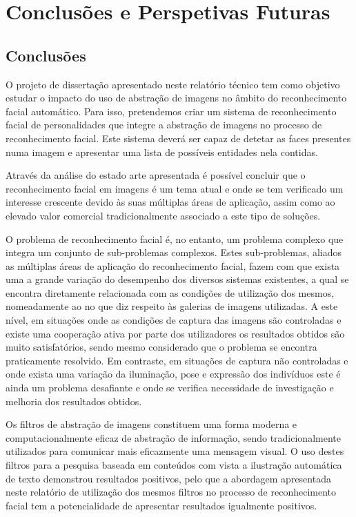 \chapter{Conclusões e Perspetivas Futuras} \label{chap:conclusao}

\section{Conclusões}
O projeto de dissertação apresentado neste relatório técnico tem como objetivo estudar o impacto do uso de abstração de imagens no âmbito do reconhecimento facial automático. Para isso, pretendemos criar um sistema de reconhecimento facial de personalidades que integre a abstração de imagens no processo de reconhecimento facial. Este sistema deverá ser capaz de detetar as faces presentes numa imagem e apresentar uma lista de possíveis entidades nela contidas.

Através da análise do estado arte apresentada é possível concluir que o reconhecimento facial em imagens é um tema atual e onde se tem verificado um interesse crescente devido às suas múltiplas áreas de aplicação, assim como ao elevado valor comercial tradicionalmente associado a este tipo de soluções. 

O problema de reconhecimento facial é, no entanto, um problema complexo que integra um conjunto de sub-problemas  complexos. Estes sub-problemas, aliados as múltiplas áreas de aplicação do reconhecimento facial, fazem com que exista uma a grande variação do desempenho dos diversos sistemas existentes, a qual se encontra diretamente relacionada com as condições de utilização dos mesmos, nomeadamente ao no que diz respeito às galerias de imagens utilizadas. A este nível, em situações onde as condições de captura das imagens são controladas e existe uma cooperação ativa por parte dos utilizadores os resultados obtidos são muito satisfatórios, sendo mesmo considerado que o problema se encontra praticamente resolvido. Em contraste, em situações de captura não controladas e onde exista uma variação da iluminação, pose e expressão dos indivíduos este é ainda um problema desafiante e onde se verifica necessidade de investigação e melhoria dos resultados obtidos.

Os filtros de abstração de imagens constituem uma forma moderna e computacionalmente eficaz de abstração de informação, sendo tradicionalmente utilizados para comunicar mais eficazmente uma mensagem visual. O uso destes filtros para a pesquisa baseada em conteúdos com vista a ilustração automática de texto demonstrou resultados positivos, pelo que a abordagem apresentada neste relatório de utilização dos mesmos filtros no processo de reconhecimento facial tem a potencialidade de apresentar resultados igualmente positivos.

